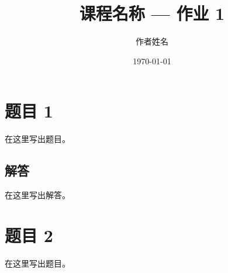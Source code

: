 \documentclass[11pt]{article}
\title{课程名称 — 作业 1}
\author{作者姓名}
\date{\today}
\begin{document}
\maketitle

\section*{题目 1}
在这里写出题目。

\subsection*{解答}
在这里写出解答。

\section*{题目 2}
在这里写出题目。
\end{document}

